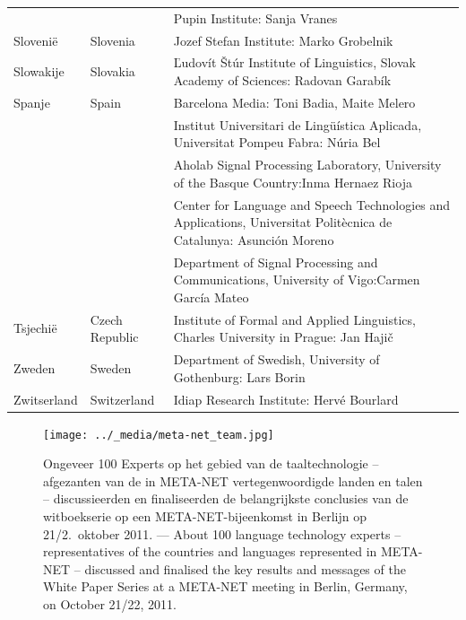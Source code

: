 \begin{longtable}{@{}llp{113mm}@{}}
  & & Pupin Institute: Sanja Vranes \\ \addlinespace
  Sloveni{\"e} & \textcolor{grey1}{Slovenia} & Jozef Stefan Institute: Marko Grobelnik \\ \addlinespace
  Slowakije & \textcolor{grey1}{Slovakia} & Ľudovít Štúr Institute of Linguistics, Slovak Academy of Sciences: Radovan Garabík \\ \addlinespace
  Spanje & \textcolor{grey1}{Spain} & Barcelona Media: Toni Badia, Maite Melero \\ \addlinespace
  & & Institut Universitari de Lingüística Aplicada, Universitat Pompeu Fabra: Núria Bel \\ \addlinespace
  & & Aholab Signal Processing Laboratory, University of the Basque Country:\newline Inma Hernaez Rioja \\ \addlinespace
  & & Center for Language and Speech Technologies and Applications, Universitat Politècnica de Catalunya:  Asunción Moreno \\ \addlinespace
  & & Department of Signal Processing and Communications, University of Vigo:\newline Carmen García Mateo \\ \addlinespace
  Tsjechi{\"e} & \textcolor{grey1}{Czech Republic} & Institute of Formal and Applied Linguistics, Charles University in Prague: Jan Hajič \\ \addlinespace


  Zweden & \textcolor{grey1}{Sweden} & Department of Swedish, University of Gothenburg: Lars Borin
  \\ \addlinespace
  Zwitserland & \textcolor{grey1}{Switzerland} & Idiap Research Institute: Hervé Bourlard
\end{longtable}
\normalsize

\renewcommand*{\figureformat}{}
\renewcommand*{\captionformat}{}

\begin{figure}[htbp]
  \center
  \texttt{[image: ../\_media/meta-net\_team.jpg]}
  \caption{Ongeveer 100 Experts op het gebied van de taaltechnologie -- afgezanten van de in META-NET ver\-te\-gen\-woor\-dig\-de landen en talen  -- discussieerden en finaliseerden de belangrijkste conclusies van de witboekserie op een META-NET-bijeenkomst in Berlijn op 21/2.~oktober 2011. --- \textcolor{grey1}{About 100 language technology experts -- representatives of the countries and languages represented in META-NET -- discussed and finalised the key results and messages of the White Paper Series at a META-NET meeting in Berlin, Germany, on October 21/22, 2011.}}
  \medskip
\end{figure}

